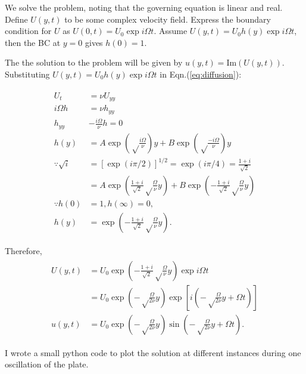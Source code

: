 \documentclass{article}
\begin{document}
We solve the problem, noting that the governing equation is linear and real. Define $U(y, t)$ to be some complex velocity field. Express the boundary condition for $U$ as $U(0, t) = U_{0} \exp{i\Omega t}$. Assume $U(y, t) = U_{0} h(y) \exp{i\Omega t}$, then the BC at $y=0$ gives $h(0) = 1$. 

The the solution to the problem will be given by $u(y, t) = \textrm{Im}(U(y, t))$. Substituting $U(y, t) = U_{0} h(y) \exp{i\Omega t}$ in Eqn.(\ref{eq:diffusion}):

\begin{align}\label{eq:substituting_ansatz}
 \begin{split}
  U_{t} &= \nu U_{yy} \\
  i \Omega h &= \nu h_{yy}\\
  h_{yy} &- \frac{i\Omega}{\nu} h = 0\\
  h(y)  &= A \exp{\left(\sqrt\frac{i\Omega}{\nu}\right)y} + B \exp{\left(\sqrt\frac{-i\Omega}{\nu}\right)y}\\
  \because \sqrt{i} &= [\exp{(i\pi/2)}]^{1/2} = \exp{(i\pi/4)} =  \frac{1 + i}{\sqrt{2}}\\
  & = A \exp{\left(\frac{1 + i}{\sqrt{2}} \sqrt\frac{\Omega}{\nu}  y \right)} + B \exp{\left(-\frac{1 + i}{\sqrt{2}} \sqrt\frac{\Omega}{\nu}  y \right)}\\
  \because h(0) &= 1, h(\infty) = 0, \\
  h(y) &= \exp{\left(-\frac{1 + i}{\sqrt{2}} \sqrt\frac{\Omega}{\nu}  y \right)}.
 \end{split}
\end{align}

Therefore,
\begin{align}\label{eq:flat_plate_soln}
 \begin{split}
  U(y, t) &= U_{0} \exp{\left(-\frac{1 + i}{\sqrt{2}} \sqrt\frac{\Omega}{\nu}  y \right)} \exp{i\Omega t}\\
  &= U_{0} \exp{\left(- \sqrt\frac{\Omega}{2\nu}  y \right)} \exp{\left[i\left(-\sqrt\frac{\Omega}{2\nu}  y  + \Omega t\right)\right]}\\
  u(y, t) &=  U_{0} \exp{\left(- \sqrt\frac{\Omega}{2\nu}  y \right)} \sin{\left(- \sqrt\frac{\Omega}{2\nu}  y  + \Omega t\right)}.
 \end{split}
\end{align}

I wrote a small python code to plot the solution at different instances during one oscillation of the plate. 
\end{document}
